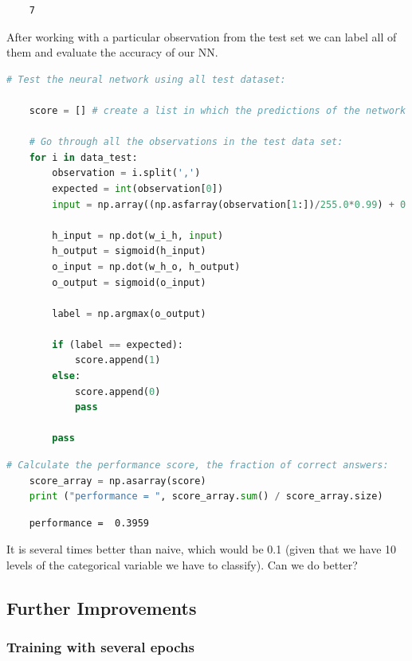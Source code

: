 \begin{lstlisting}
    7
\end{lstlisting}

After working with a particular observation from the test set we can label all of them and evaluate the accuracy of our NN.

\begin{lstlisting}[language=Python]   
    # Test the neural network using all test dataset:
    
    score = [] # create a list in which the predictions of the network will we saved.
    
    # Go through all the observations in the test data set:
    for i in data_test:
        observation = i.split(',')
        expected = int(observation[0])
        input = np.array((np.asfarray(observation[1:])/255.0*0.99) + 0.01, ndmin=2).T
    
        h_input = np.dot(w_i_h, input)
        h_output = sigmoid(h_input)
        o_input = np.dot(w_h_o, h_output)
        o_output = sigmoid(o_input)
    
        label = np.argmax(o_output)
    
        if (label == expected):
            score.append(1)
        else:
            score.append(0)
            pass
        
        pass
\end{lstlisting}

\begin{lstlisting}[language=Python]   
    # Calculate the performance score, the fraction of correct answers:
    score_array = np.asarray(score)
    print ("performance = ", score_array.sum() / score_array.size)
    \end{lstlisting}

\begin{lstlisting}
    performance =  0.3959
\end{lstlisting}

  It is several times better than naive, which would be 0.1 (given that we have 10 levels of the categorical variable we have to classify). Can we do better?
  
\subsection{Further Improvements}

\subsubsection{Training with several epochs}
   
